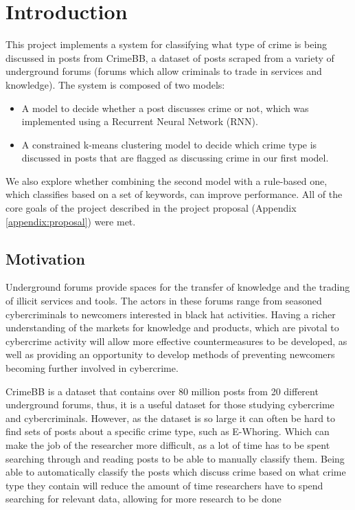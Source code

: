 \documentclass[12pt,a4paper,twoside,openright]{report}
\begin{document}
\chapter{Introduction}
This project implements a system for classifying what type of crime is being discussed in posts from CrimeBB, a dataset of posts scraped from a variety of underground forums (forums which allow criminals to trade in services and knowledge). The system is composed of two models:
\begin{itemize}
    \item A model to decide whether a post discusses crime or not, which was implemented using a Recurrent Neural Network (RNN).
    \item A constrained k-means clustering model to decide which crime type is discussed in posts that are flagged as discussing crime in our first model.
\end{itemize}
We also explore whether combining the second model with a rule-based one, which classifies based on a set of keywords, can improve performance. All of the core goals of the project described in the project proposal (Appendix \ref{appendix:proposal}) were met. 

\section{Motivation}
Underground forums provide spaces for the transfer of knowledge and the trading of illicit services and tools. The actors in these forums range from seasoned cybercriminals to newcomers interested in black hat activities. Having a richer understanding of the markets for knowledge and products, which are pivotal to cybercrime activity will allow more effective countermeasures to be developed, as well as providing an opportunity to develop methods of preventing newcomers becoming further involved in cybercrime. 
\newline

CrimeBB \cite{crimebb} is a dataset that contains over 80 million posts from 20 different underground forums, thus, it is a useful dataset for those studying cybercrime and cybercriminals. However, as the dataset is so large it can often be hard to find sets of posts about a specific crime type, such as E-Whoring. Which can make the job of the researcher more difficult, as a lot of time has to be spent searching through and reading posts to be able to manually classify them. Being able to automatically classify the posts which discuss crime based on what crime type they contain will reduce the amount of time researchers have to spend searching for relevant data, allowing for more research to be done 
\end{document}
